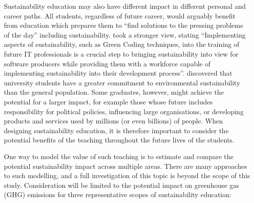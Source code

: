 Sustainability education may also have different impact in different personal and career paths. All students, regardless of future career, would arguably benefit from education which prepares them to \enquote{find solutions to the pressing problems of the day} \citep{Shephard2013} including sustainability. \citet{Junger2024} took a stronger view, stating \enquote{Implementing aspects of sustainability, such as Green Coding techniques, into the training of future IT professionals is a crucial step to bringing sustainability into view for software producers while providing them with a workforce capable of implementing sustainability into their development process}. \citet{Cotton2013} discovered that university students have a greater commitment to environmental sustainability than the general population. Some graduates, however, might achieve the potential for a larger impact, for example those whose future includes responsibility for political policies, influencing large organisations, or developing products and services used by millions (or even billions) of people. When designing sustainability education, it is therefore important to consider the potential benefits of the teaching throughout the future lives of the students.

One way to model the value of such teaching is to estimate and compare the potential sustainability impact across multiple areas. There are many approaches to such modelling, and a full investigation of this topic is beyond the scope of this study. Consideration will be limited to the potential impact on greenhouse gas (GHG) emissions for three representative scopes of sustainability education:

